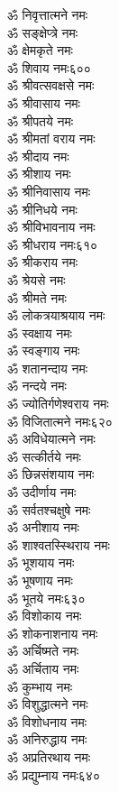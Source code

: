 \begin{center}
\begin{multicols}{2}
\begin{flushleft}
ॐ निवृत्तात्मने नमः\\
ॐ सङ्क्षेप्त्रे नमः\\
ॐ क्षेमकृते नमः\\
ॐ शिवाय नमः\hfill ६००\\
ॐ श्रीवत्सवक्षसे नमः\\
ॐ श्रीवासाय नमः\\
ॐ श्रीपतये नमः\\
ॐ श्रीमतां वराय नमः\\
ॐ श्रीदाय नमः\\
ॐ श्रीशाय नमः\\
ॐ श्रीनिवासाय नमः\\
ॐ श्रीनिधये नमः\\
ॐ श्रीविभावनाय नमः\\
ॐ श्रीधराय नमः\hfill ६१०\\
ॐ श्रीकराय नमः\\
ॐ श्रेयसे नमः\\
ॐ श्रीमते नमः\\
ॐ लोकत्रयाश्रयाय नमः\\
ॐ स्वक्षाय नमः\\
ॐ स्वङ्गाय नमः\\
ॐ शतानन्दाय नमः\\
ॐ नन्दये नमः\\
ॐ ज्योतिर्गणेश्वराय नमः\\
ॐ विजितात्मने नमः\hfill ६२०\\
ॐ अविधेयात्मने नमः\\
ॐ सत्कीर्तये नमः\\
ॐ छिन्नसंशयाय नमः\\
ॐ उदीर्णाय नमः\\
ॐ सर्वतश्चक्षुषे नमः\\
ॐ अनीशाय नमः\\
ॐ शाश्वतस्स्थिराय नमः\\
ॐ भूशयाय नमः\\
ॐ भूषणाय नमः\\
ॐ भूतये नमः\hfill ६३०\\
ॐ विशोकाय नमः\\
ॐ शोकनाशनाय नमः\\
ॐ अर्चिष्मते नमः\\
ॐ अर्चिताय नमः\\
ॐ कुम्भाय नमः\\
ॐ विशुद्धात्मने नमः\\
ॐ विशोधनाय नमः\\
ॐ अनिरुद्धाय नमः\\
ॐ अप्रतिरथाय नमः\\
ॐ प्रद्युम्नाय नमः\hfill ६४०\\

\end{flushleft}
\end{multicols}
\end{center}
